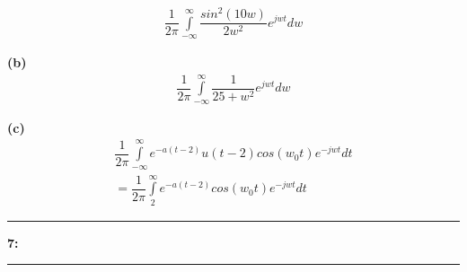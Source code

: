 \documentclass[11pt]{article}
\newcommand\question[2]{\vspace{.25in}\hrule\textbf{#1: #2}\vspace{.5em}\hrule\vspace{.10in}}
\renewcommand\part[1]{\vspace{.10in}\textbf{(#1)}}
\newcommand\tab[1][1cm]{\hspace*{#1}}
\begin{document}
\begin{eqnarray*}
	\dfrac{1}{2 \pi} \int\limits_{-\infty}^{\infty} \dfrac{sin^2(10w)}{2w^2} e^{jwt} dw
\end{eqnarray*}

\part{b} \\

\begin{eqnarray*}
	\dfrac{1}{2 \pi} \int\limits_{-\infty}^{\infty} \dfrac{1}{25 + w^2} e^{jwt} dw
\end{eqnarray*}

\part{c} \\

\begin{eqnarray*}
	\dfrac{1}{2 \pi} \int\limits_{-\infty}^{\infty} e^{-a(t-2)}u(t-2)cos(w_0t)e^{-jwt} dt \\
	= \dfrac{1}{2 \pi} \int\limits_{2}^{\infty} e^{-a(t-2)}cos(w_0t)e^{-jwt} dt
\end{eqnarray*}

\question{7}{} 

\tab \\
\tab \\
\tab \\
\tab \\
\tab \\
\tab \\
\end{document}
